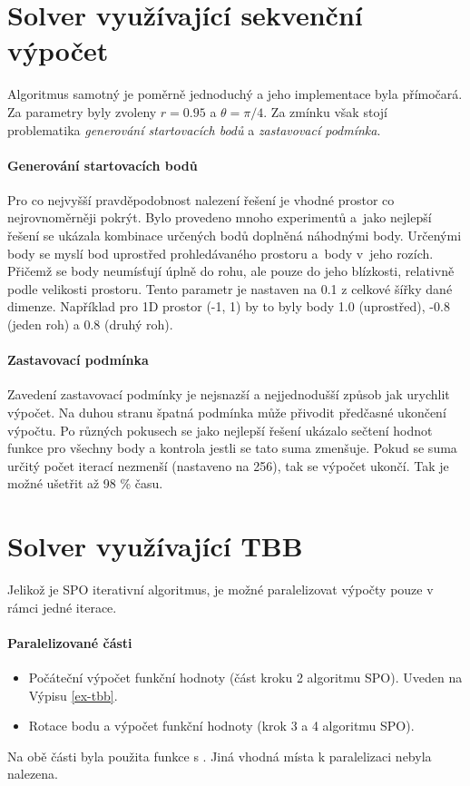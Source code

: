 \documentclass[12pt, a4paper]{report}
\begin{document}
\section{Solver využívající sekvenční výpočet}
Algoritmus samotný je poměrně jednoduchý a jeho implementace byla přímočará. Za parametry byly zvoleny $r = 0.95$ a $\theta = \pi / 4$.
Za zmínku však stojí problematika \emph{generování startovacích bodů} a \emph{zastavovací podmínka}.

\paragraph{Generování startovacích bodů}
Pro co nejvyšší pravděpodobnost nalezení řešení je vhodné prostor co nejrovnoměrněji pokrýt.
Bylo provedeno mnoho experimentů a~jako nejlepší řešení se ukázala kombinace určených bodů doplněná náhodnými body.
Určenými body se myslí bod uprostřed prohledávaného prostoru a~body v~jeho rozích.
Přičemž se body neumísťují úplně do rohu, ale pouze do jeho blízkosti, relativně podle velikosti prostoru.
Tento parametr je nastaven na 0.1 z celkové šířky dané dimenze.
Například pro 1D prostor (-1, 1) by to byly body 1.0 (uprostřed), -0.8 (jeden roh) a 0.8 (druhý roh).

\paragraph{Zastavovací podmínka}
Zavedení zastavovací podmínky je nejsnazší a nejjednodušší způsob jak urychlit výpočet.
Na duhou stranu špatná podmínka může přivodit předčasné ukončení výpočtu.
Po různých pokusech se jako nejlepší řešení ukázalo sečtení hodnot funkce pro všechny body a kontrola jestli se tato suma zmenšuje.
Pokud se suma určitý počet iterací nezmenší (nastaveno na 256), tak se výpočet ukončí.
Tak je možné ušetřit až 98 \% času.

\section{Solver využívající TBB}
Jelikož je SPO iterativní algoritmus, je možné paralelizovat výpočty pouze v rámci jedné iterace.

\paragraph{Paralelizované části}
\begin{itemize}
	\item Počáteční výpočet funkční hodnoty (část kroku 2 algoritmu SPO). Uveden na Výpisu \ref{ex-tbb}.
	\item Rotace bodu a výpočet funkční hodnoty (krok 3 a 4 algoritmu SPO).
\end{itemize}
\noindent
Na obě části byla použita funkce  s .
Jiná vhodná místa k paralelizaci nebyla nalezena.
\end{document}
